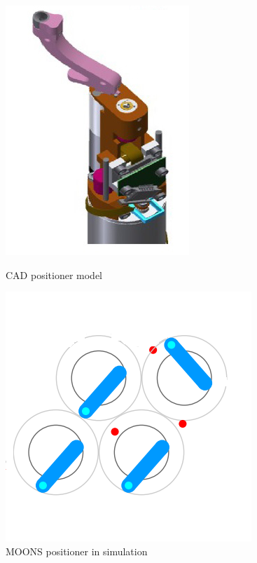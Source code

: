 \documentclass[]{spie}  %
\begin{document}
	\begin{figure}[H]
		\hspace{2cm}
		\begin{minipage}[t]{4.5cm}
			\includegraphics[scale=1.2]{images/realPositioner.jpg}
			\caption{CAD positioner model}
			\label{MOONS_positioner_representation}
		\end{minipage}
		\begin{minipage}[t]{5cm}
			\includegraphics[scale=0.56]{images/MOONSPositioner_Simulation.png}
			\caption{MOONS positioner in simulation}
			\label{MOONS_positioner_simulation}
		\end{minipage}
		\begin{minipage}[t]{5cm}

\end{minipage}
\end{figure}
\end{document}
